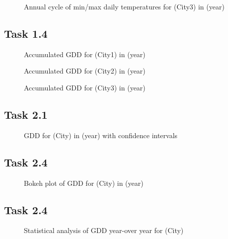 \documentclass[12pt]{article}
\begin{document}
\begin{figure}[!htbp]
\centering
\caption{\scriptsize Annual cycle of min/max daily temperatures for (City3) in (year)}
\label{minmax3}		  
\end{figure}

\subsection{Task 1.4}	

\begin{figure}[!htbp]
\centering
\caption{\scriptsize Accumulated GDD for (City1) in (year)}
\label{accuGDD_1}		  
\end{figure}

\begin{figure}[!htbp]
\centering
\caption{\scriptsize Accumulated GDD for (City2) in (year)}
\label{accuGDD_2}		  
\end{figure}
	
\begin{figure}[!htbp]
\centering
\caption{\scriptsize Accumulated GDD for (City3) in (year)}
\label{accuGDD_3}		  
\end{figure}	

\pagebreak 	

\subsection{Task 2.1}
\begin{figure}[!htbp]
\centering
\caption{\scriptsize GDD for (City) in (year) with confidence intervals}
\label{GDDwCI}		  
\end{figure}

\subsection{Task 2.4}
\begin{figure}[!htbp]
\centering
\caption{\scriptsize Bokeh plot of GDD for (City) in (year)}
\label{bokeh}		  
\end{figure}


\subsection{Task 2.4}
\begin{figure}[!htbp]
\centering
\caption{\scriptsize Statistical analysis of GDD year-over year for (City)}
\label{regression}		  
\end{figure}
\end{document}
